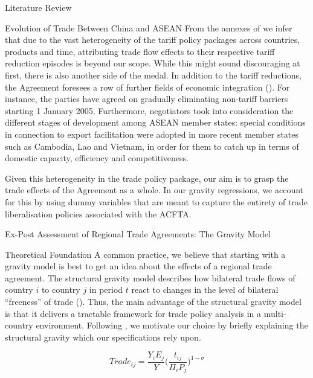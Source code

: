 \begin{section}{Literature Review}
\begin{subsection}{Evolution of Trade Between China and ASEAN}
From the annexes of \cite{asean_2002_4} we infer that due to the vast heterogeneity of the tariff policy packages across countries, products and time, attributing trade flow effects to their respective tariff reduction episodes is beyond our scope. While this might sound discouraging at first, there is also another side of the medal. In addition to the tariff reductions, the Agreement foresees a row of further fields of economic integration (\cite{asean_2002_1}). For instance, the parties have agreed on gradually eliminating non-tariff barriers starting 1 January 2005. Furthermore, negotiators took into consideration the different stages of development among ASEAN member states: special conditions in connection to export facilitation were adopted in more recent member states such as Cambodia, Lao and Vietnam, in order for them to catch up in terms of domestic capacity, efficiency and competitiveness.

Given this heterogeneity in the trade policy package, our aim is to grasp the trade effects of the Agreement as a whole. In our gravity regressions, we account for this by using dummy variables that are meant to capture the entirety of trade liberalisation policies associated with the ACFTA.

\end{subsection}

\begin{subsection}{Ex-Post Assessment of Regional Trade Agreements: The Gravity Model}

\begin{subsubsection}{Theoretical Foundation}
A common practice, we believe that starting with a gravity model is best to get an idea about the effects of a regional trade agreement. The structural gravity model describes how bilateral trade flows of country $i$ to country $j$ in period $t$ react to changes in the level of bilateral “freeness” of trade (\cite{mvzj_2019}). Thus, the main advantage of the structural gravity model is that it delivers a tractable framework for trade policy analysis in a multi-country environment. Following \cite{ypl_2016}, we motivate our choice by briefly explaining the structural gravity which our specifications rely upon. 

\begin{equation}\label{eq_1}
    Trade_{ij}=\frac{Y_{i}E_{j}}{Y}\Big(\frac{t_{ij}}{\Pi_{i}P_{j}}\Big)^{1-\sigma}
\end{equation}


\end{subsubsection}
\end{subsection}
\end{section}
